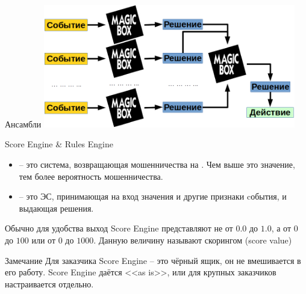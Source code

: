   \begin{frame}{Ансамбли}
  \includegraphics[width=11cm]{../pic/ensemble_example.png}
  \end{frame}



\begin{frame}{Score Engine \& Rules Engine}
	\small
	\begin{itemize}
		\item {} -- это система,
		возвращающая  мошенничества на .
		Чем выше это значение, тем более вероятность мошенничества.
		\item {}-- это ЭС,
		принимающая на вход значения 
		и другие признаки cобытия, и выдающая решения.
	\end{itemize}
	
	Обычно для удобства выход Score Engine представляют не от $0.0$ до $1.0$, 
	а от $0$ до $100$ или от $0$ до $1000$. Данную величину называют скорингом (score value)
	
	\begin{block}{Замечание}
		Для заказчика Score Engine -- это чёрный ящик,
		он не вмешивается в его работу. 
		Score Engine даётся <<as is>>, 
		или для крупных заказчиков настраивается отдельно.
	\end{block}
\end{frame}




